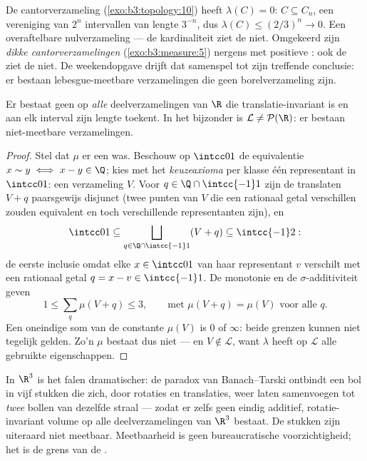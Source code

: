 \begin{example}\label{ex:b3:measure:cantor}
De cantorverzameling (\cref{exo:b3:topology:10}) heeft
$\lambda(C) = 0$: $C \subseteq C_n$, een vereniging van $2^n$
intervallen van lengte $3^{-n}$, dus $\lambda(C) \leq (2/3)^n \to
0$. Een overaftelbare nulverzameling --- de kardinaliteit ziet de
 niet. Omgekeerd zijn \emph{dikke cantorverzamelingen}
(\cref{exo:b3:measure:5}) nergens  met positieve : ook
de  ziet de  niet. De weekendopgave drijft dat
samenspel tot zijn treffende conclusie: er bestaan
lebesgue-meetbare verzamelingen die geen borelverzameling zijn.
\end{example}

\begin{theorem}[Vitali]\label{thm:b3:measure:vitali}
Er bestaat geen  op \emph{alle} deelverzamelingen van $\R$ die
translatie-invariant is en aan elk interval zijn lengte toekent.
In het bijzonder is $\mathcal L \neq \mathcal P(\R)$: er bestaan
niet-meetbare verzamelingen.
\end{theorem}

\begin{proof}
Stel dat $\mu$ er een was. Beschouw op $\intcc01$ de equivalentie
$x \sim y \iff x - y \in \Q$; kies met het \emph{keuzeaxioma} per
klasse één representant in $\intcc01$: een verzameling $V$. Voor
$q \in \Q\cap\intcc{-1}1$ zijn de translaten $V + q$ paarsgewijs
disjunct (twee punten van $V$ die een rationaal getal verschillen
zouden equivalent en toch verschillende representanten zijn), en
\[
\intcc01 \subseteq \bigsqcup_{q \in \Q\cap\intcc{-1}1}(V + q)
\subseteq \intcc{-1}2 :
\]
de eerste inclusie omdat elke $x \in \intcc01$ van haar
representant $v$ verschilt met een rationaal getal $q = x - v \in
\intcc{-1}1$. De monotonie en de $\sigma$-additiviteit geven
\[
1 \leq \sum_{q}\mu(V + q) \leq 3,
\qquad\text{met } \mu(V + q) = \mu(V) \text{ voor alle } q .
\]
Een oneindige som van de constante $\mu(V)$ is $0$ of $\infty$:
beide grenzen kunnen niet tegelijk gelden. Zo'n $\mu$ bestaat dus
niet --- en $V \notin \mathcal L$, want $\lambda$ heeft op
$\mathcal L$ alle gebruikte eigenschappen.
\end{proof}

\begin{remark}\label{rem:b3:measure:banachtarski}
In $\R^3$ is het falen dramatischer: de paradox van
Banach--Tarski ontbindt een bol in vijf stukken die zich, door
rotaties en translaties, weer laten samenvoegen tot \emph{twee}
bollen van dezelfde straal --- zodat er zelfs geen eindig
additief, rotatie-invariant volume op alle deelverzamelingen van
$\R^3$ bestaat. De stukken zijn uiteraard niet meetbaar.
Meetbaarheid is geen bureaucratische voorzichtigheid; het is de
grens van de .
\end{remark}

